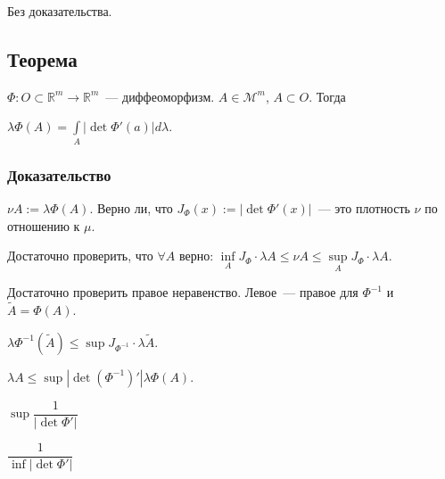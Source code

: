 \documentclass{article}
\begin{document}
            Без доказательства.
        
        \subsection{Теорема}
        
            $\Phi : O \subset \mathbb{R}^m \rightarrow \mathbb{R}^m$~--- диффеоморфизм. $A \in \mathcal{M}^m$, $A \subset O$. Тогда
        
            $\lambda \Phi(A) = \int\limits_{A} \left| \det \Phi'(a) \right| d \lambda$.
        
        \subsubsection{Доказательство}
        
            $\nu A := \lambda \Phi(A)$. Верно ли, что $J_{\Phi} (x) := \left| \det \Phi'(x) \right|$~--- это плотность $\nu$ по отношению к $\mu$.
            
            Достаточно проверить, что $\forall A$ верно: $\inf\limits_{A} J_{\Phi} \cdot \lambda A \leqslant \nu A \leqslant \sup\limits_{A} J_{\Phi} \cdot \lambda A$.
            
            Достаточно проверить правое неравенство. Левое~--- правое для $\Phi^{-1}$ и $\widetilde{A} = \Phi(A)$.
            
            $\lambda \Phi^{-1} \left( \widetilde{A} \right) \leqslant \sup J_{\Phi^{-1}} \cdot \lambda \widetilde{A}$.
            
            $\lambda A \leqslant \sup \left| \det (\Phi^{-1})' \right| \lambda \Phi(A)$.
            
            $\sup \dfrac{1}{\left| \det \Phi' \right|}$
            
            $\dfrac{1}{\inf \left| \det \Phi' \right|}$
            
\end{document}

